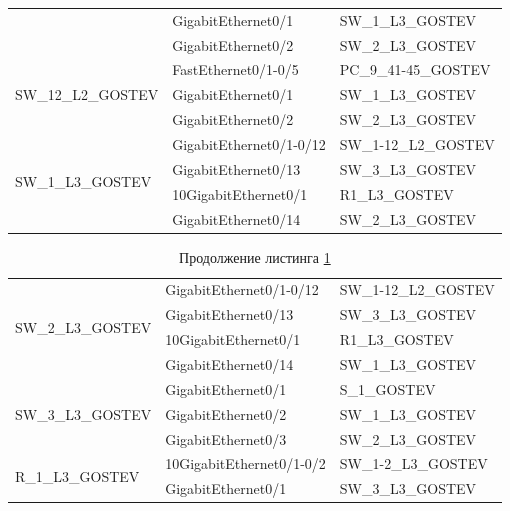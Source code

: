 \documentclass[14pt, a4paper]{extarticle}
\numberwithin{equation}{section}
\begin{document}
\begin{table}[H]
\begin{tabular}{|l|l|l|}
                                    & GigabitEthernet0/1       & SW\_1\_L3\_GOSTEV             \\ \cline{2-3} 
                                    & GigabitEthernet0/2       & SW\_2\_L3\_GOSTEV             \\ \hline
\multirow{3}{*}{SW\_12\_L2\_GOSTEV} & FastEthernet0/1-0/5      & PC\_9\_41-45\_GOSTEV          \\ \cline{2-3} 
                                    & GigabitEthernet0/1       & SW\_1\_L3\_GOSTEV             \\ \cline{2-3} 
                                    & GigabitEthernet0/2       & SW\_2\_L3\_GOSTEV             \\ \hline
\multirow{4}{*}{SW\_1\_L3\_GOSTEV}  & GigabitEthernet0/1-0/12  & SW\_1-12\_L2\_GOSTEV          \\ \cline{2-3} 
                                    & GigabitEthernet0/13      & SW\_3\_L3\_GOSTEV             \\ \cline{2-3} 
                                    & 10GigabitEthernet0/1     & R1\_L3\_GOSTEV                \\ \cline{2-3} 
                                    & GigabitEthernet0/14      & SW\_2\_L3\_GOSTEV             \\ 
\end{tabular}
\label{table:mainDepConnectionPlan}
\end{table}

\newpage
\begin{table}[H]
\small
\centering
\caption{Продолжение листинга \ref{table:mainDepConnectionPlan}}
\begin{tabular}{|l|l|l|}
\multirow{4}{*}{SW\_2\_L3\_GOSTEV}  & GigabitEthernet0/1-0/12  & SW\_1-12\_L2\_GOSTEV          \\ \cline{2-3} 
                                    & GigabitEthernet0/13      & SW\_3\_L3\_GOSTEV             \\ \cline{2-3} 
                                    & 10GigabitEthernet0/1     & R1\_L3\_GOSTEV                \\ \cline{2-3} 
                                    & GigabitEthernet0/14      & SW\_1\_L3\_GOSTEV             \\ \hline
\multirow{3}{*}{SW\_3\_L3\_GOSTEV}  & GigabitEthernet0/1       & S\_1\_GOSTEV                  \\ \cline{2-3} 
                                    & GigabitEthernet0/2       & SW\_1\_L3\_GOSTEV             \\ \cline{2-3} 
                                    & GigabitEthernet0/3       & SW\_2\_L3\_GOSTEV             \\ \hline
\multirow{2}{*}{R\_1\_L3\_GOSTEV}   & 10GigabitEthernet0/1-0/2 & SW\_1-2\_L3\_GOSTEV           \\ \cline{2-3} 
                                    & GigabitEthernet0/1       & SW\_3\_L3\_GOSTEV             \\ \hline
\end{tabular}
\end{table}
\end{document}
